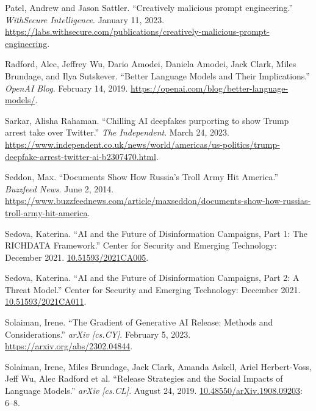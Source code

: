\documentclass{article}
\begin{document}
\begin{thebibliography}{9}
  Patel, Andrew and Jason Sattler. ``Creatively malicious prompt engineering.'' \textit{WithSecure Intelligence}. January 11, 2023. \href{https://labs.withsecure.com/publications/creatively-malicious-prompt-engineering}{https://labs.withsecure.com/publications/creatively-malicious-prompt-engineering}. 

  Radford, Alec, Jeffrey Wu, Dario Amodei, Daniela Amodei, Jack Clark, Miles Brundage, and Ilya Sutskever. ``Better Language Models and Their Implications.'' \textit{OpenAI Blog}. February 14, 2019. \href{https://openai.com/blog/better-language-models/}{https://openai.com/blog/better-language-models/}.

  Sarkar, Alisha Rahaman. ``Chilling AI deepfakes purporting to show Trump arrest take over Twitter.'' \textit{The Independent}. March 24, 2023. \href{https://www.independent.co.uk/news/world/americas/us-politics/trump-deepfake-arrest-twitter-ai-b2307470.html}{https://www.independent.co.uk/news/world/americas/us-politics/trump-deepfake-arrest-twitter-ai-b2307470.html}. 

  Seddon, Max. ``Documents Show How Russia’s Troll Army Hit America.'' \textit{Buzzfeed News}. June 2, 2014. \href{https://www.buzzfeednews.com/article/maxseddon/documents-show-how-russias-troll-army-hit-america}{https://www.buzzfeednews.com/article/maxseddon/documents-show-how-russias-troll-army-hit-america}.

  Sedova, Katerina. ``AI and the Future of Disinformation Campaigns, Part 1: The RICHDATA Framework.'' Center for Security and Emerging Technology: December 2021. \href{https://cset.georgetown.edu/publication/ai-and-the-future-of-disinformation-campaigns/}{10.51593/2021CA005}.

  Sedova, Katerina. ``AI and the Future of Disinformation Campaigns, Part 2: A Threat Model.'' Center for Security and Emerging Technology: December 2021. \href{https://cset.georgetown.edu/publication/ai-and-the-future-of-disinformation-campaigns-2/}{10.51593/2021CA011}.

  Solaiman, Irene. ``The Gradient of Generative AI Release: Methods and Considerations.'' \textit{arXiv [cs.CY]}. February 5, 2023. \href{https://arxiv.org/abs/2302.04844}{https://arxiv.org/abs/2302.04844}. 

  Solaiman, Irene, Miles Brundage, Jack Clark, Amanda Askell, Ariel Herbert-Voss, Jeff Wu, Alec Radford et al. ``Release Strategies and the Social Impacts of Language Models.'' \textit{arXiv [cs.CL]}. August 24, 2019. \href{https://arxiv.org/abs/1908.09203}{10.48550/arXiv.1908.09203}: 6–8.


\end{thebibliography}
\end{document}

